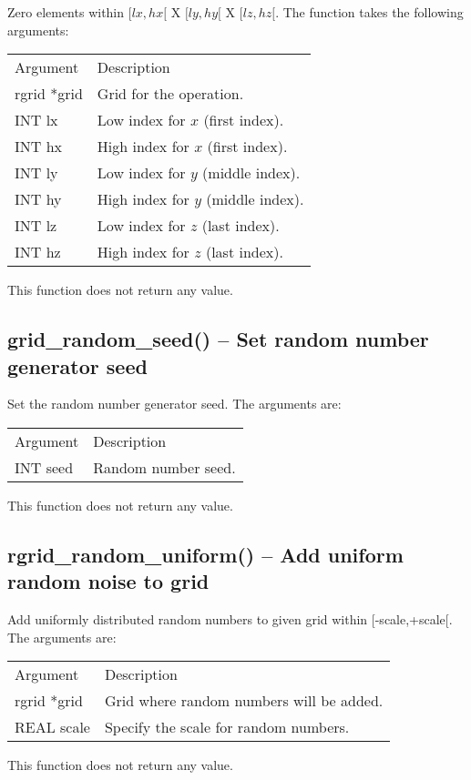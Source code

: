 \documentclass[12pt,letterpaper]{report}
\begin{document}
Zero elements within $[lx, hx[$ X $[ly, hy[$ X $[lz, hz[$. The function takes the following arguments:
\begin{longtable}{p{} p{}}
Argument & Description\\
\cline{1-2}
rgrid *grid & Grid for the operation.\\ 
INT lx & Low index for $x$ (first index).\\
INT hx & High index for $x$ (first index).\\
INT ly & Low index for $y$ (middle index).\\
INT hy & High index for $y$ (middle index).\\
INT lz & Low index for $z$ (last index).\\
INT hz & High index for $z$ (last index).\\
\end{longtable}
\noindent
This function does not return any value. 

\subsection{grid\_random\_seed() -- Set random number generator seed}

Set the random number generator seed. The arguments are:
\begin{longtable}{p{} p{}}
Argument & Description\\
\cline{1-2}
INT seed & Random number seed.\\
\end{longtable}
\noindent
This function does not return any value. 

\subsection{rgrid\_random\_uniform() -- Add uniform random noise to grid}

Add uniformly distributed random numbers to given grid within [-scale,+scale[. The arguments are:
\begin{longtable}{p{} p{}}
Argument & Description\\
\cline{1-2}
rgrid *grid & Grid where random numbers will be added.\\
REAL scale & Specify the scale for random numbers.\\
\end{longtable}
\noindent
This function does not return any value. 
\end{document}
